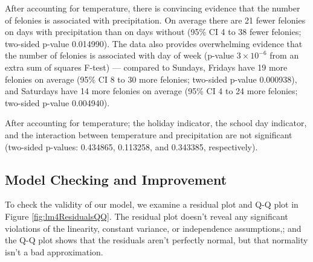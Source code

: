 \documentclass[11pt,notitlepage]{article}
\begin{document}





After accounting for temperature, there is convincing evidence that the number of felonies is associated with precipitation. On average there are 21 fewer felonies on days with precipitation than on days without (95\% CI 4 to 38 fewer felonies; two-sided p-value 0.014990). The data also provides overwhelming evidence that the number of felonies is associated with day of week (p-value $3 \times 10^{-6}$ from an extra sum of squares F-test) --- compared to Sundays, Fridays have 19 more felonies on average (95\% CI 8 to 30 more felonies; two-sided p-value 0.000938), and Saturdays have 14 more felonies on average (95\% CI 4 to 24 more felonies; two-sided p-value 0.004940).

After accounting for temperature; the holiday indicator, the school day indicator, and the interaction between temperature and precipitation are not significant (two-sided p-values: 0.434865, 0.113258, and 0.343385, respectively).

\subsection{Model Checking and Improvement}
\label{sec:modelFeloniesModelCheckingImprovement}

To check the validity of our model, we examine a residual plot and Q-Q plot in Figure \ref{fig:lm4ResidualsQQ}. The residual plot doesn't reveal any significant violations of the linearity, constant variance, or independence assumptions,; and the Q-Q plot shows that the residuals aren't perfectly normal, but that normality isn't a bad approximation.
\end{document}

